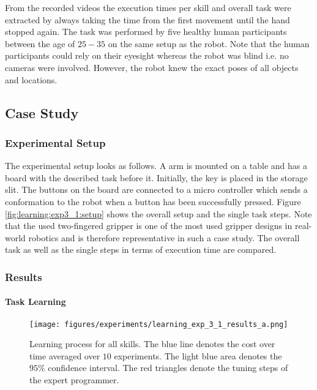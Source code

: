 From the recorded videos the execution times per skill and overall task were extracted by always taking the time from the first movement until the hand stopped again.
The task was performed by five healthy human participants between the age of $25-35$ on the same setup as the robot.
Note that the human participants could rely on their eyesight whereas the robot was blind i.e. no cameras were involved.
However, the robot knew the exact poses of all objects and locations.


\subsection{Case Study}

\subsubsection{Experimental Setup}

The experimental setup looks as follows.
A \platformname{} arm \cite{Haddadin.04.02.2021} is mounted on a table and has a board with the described task before it.
Initially, the key is placed in the storage slit.
The buttons on the board are connected to a micro controller which sends a conformation to the robot when a button has been successfully pressed.
Figure \ref{fig:learning:exp3_1:setup} shows the overall setup and the single task steps.
Note that the used two-fingered gripper is one of the most used gripper designs in real-world robotics and is therefore representative in such a case study.
The overall task as well as the single steps in terms of execution time are compared.

\subsubsection{Results}

\paragraph{Task Learning}

\begin{figure}[ht!]
\texttt{[image: figures/experiments/learning\_exp\_3\_1\_results\_a.png]}
\caption{Learning process for all skills. The blue line denotes the cost over time averaged over $10$ experiments. The light blue area denotes the $95 \%$ confidence interval. The red triangles denote the tuning steps of the expert programmer.}
\label{fig:learning:exp_3_1:results_a}
\end{figure}

